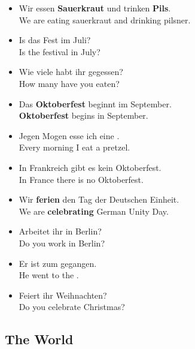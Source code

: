 \begin{itemize}
  \item  Wir essen \textbf{Sauerkraut} und trinken \textbf{Pils}. \\
  We are eating sauerkraut and drinking pilsner.
  \item  Is das Fest im Juli? \\
  Is the festival in July?
  \item  Wie viele  habt ihr gegessen? \\
  How many  have you eaten?
  \item  Das \textbf{Oktoberfest} beginnt im September. \\
  \textbf{Oktoberfest} begins in September.
  \item  Jegen Mogen esse ich eine . \\
  Every morning I eat a pretzel.
  \item  In Frankreich gibt es kein Oktoberfest. \\
  In France there is no Oktoberfest.
  \item  Wir \textbf{ferien} den Tag der Deutschen Einheit. \\
  We are \textbf{celebrating} German Unity Day.
  \item  Arbeitet ihr in Berlin? \\
  Do you work in Berlin?
  \item  Er ist zum  gegangen. \\
  He went to the .
  \item  Feiert ihr Weihnachten? \\
  Do you celebrate Christmas?
\end{itemize}


\pagebreak
\subsection{The World}

